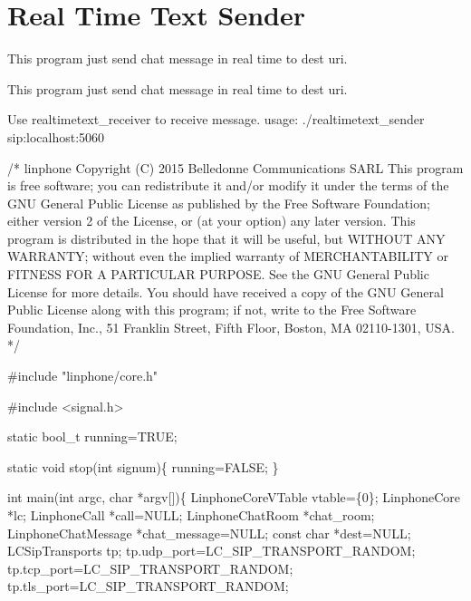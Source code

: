 \section{Real Time Text Sender}
\label{group__real__time__text__sender}


This program just send chat message in real time to dest uri.  


This program just send chat message in real time to dest uri. 

Use realtimetext\+\_\+receiver to receive message. usage\+: ./realtimetext\+\_\+sender sip\+:localhost\+:5060


\begin{DoxyCodeInclude}

\textcolor{comment}{/*}
\textcolor{comment}{linphone}
\textcolor{comment}{Copyright (C) 2015  Belledonne Communications SARL}
\textcolor{comment}{}
\textcolor{comment}{This program is free software; you can redistribute it and/or}
\textcolor{comment}{modify it under the terms of the GNU General Public License}
\textcolor{comment}{as published by the Free Software Foundation; either version 2}
\textcolor{comment}{of the License, or (at your option) any later version.}
\textcolor{comment}{}
\textcolor{comment}{This program is distributed in the hope that it will be useful,}
\textcolor{comment}{but WITHOUT ANY WARRANTY; without even the implied warranty of}
\textcolor{comment}{MERCHANTABILITY or FITNESS FOR A PARTICULAR PURPOSE.  See the}
\textcolor{comment}{GNU General Public License for more details.}
\textcolor{comment}{}
\textcolor{comment}{You should have received a copy of the GNU General Public License}
\textcolor{comment}{along with this program; if not, write to the Free Software}
\textcolor{comment}{Foundation, Inc., 51 Franklin Street, Fifth Floor, Boston, MA  02110-1301, USA.}
\textcolor{comment}{*/}

\textcolor{preprocessor}{#include "linphone/core.h"}

\textcolor{preprocessor}{#include <signal.h>}

\textcolor{keyword}{static} bool\_t running=TRUE;

\textcolor{keyword}{static} \textcolor{keywordtype}{void} stop(\textcolor{keywordtype}{int} signum)\{
        running=FALSE;
\}



\textcolor{keywordtype}{int} main(\textcolor{keywordtype}{int} argc, \textcolor{keywordtype}{char} *argv[])\{
        LinphoneCoreVTable vtable=\{0\};
        LinphoneCore *lc;
        LinphoneCall *call=NULL;
        LinphoneChatRoom *chat\_room;
        LinphoneChatMessage *chat\_message=NULL;
        \textcolor{keyword}{const} \textcolor{keywordtype}{char} *dest=NULL;
        LCSipTransports tp;
        tp.udp\_port=LC_SIP_TRANSPORT_RANDOM;
        tp.tcp\_port=LC_SIP_TRANSPORT_RANDOM;
        tp.tls\_port=LC_SIP_TRANSPORT_RANDOM;


\end{DoxyCodeInclude}

